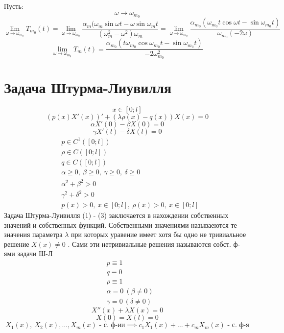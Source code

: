 \documentclass[a4paper]{article}
\begin{document}
Пусть:
\[
    \omega \to \omega_{m_0}
\]
\[
    \lim_{\omega \to \omega_{m_0}} T_{m_0}(t) = \lim_{\omega \to \omega_{m_0}} 
    \frac{\alpha_m (\omega_m \sin \omega t - \omega \sin \omega_m t}
    {(\omega_m^2 - \omega^2)\omega_m} = \lim_{\omega \to \omega_{m_0}}
    \frac{\alpha_{m_0}(\omega_{m_0} t \cos\omega t - \sin \omega_{m_0} t)}
    {\omega_{m_0}(-2 \omega)} 
\]
\[
    \lim_{\omega \to \omega_{m_0}} T_m(t) = 
    \frac{\alpha_{m_0}(t \omega_{m_0}\cos\omega_{m_0} t - \sin \omega_{m_0} t)}
    {-2 \omega_{m_0}^2} 
\]
\section*{Задача Штурма-Лиувилля}

\[
    x \in [0;l]
\]
\begin{equation}
    (p(x)X'(x))' + (\lambda\rho(x) - q(x)) X(x) = 0
\end{equation}
\begin{equation}
    \alpha X'(0) - \beta X(0) = 0
\end{equation}
\begin{equation}
    \gamma X'(l) - \delta X(l) = 0
\end{equation}
\begin{equation}
    \begin{aligned}
        &p \in C^{1}([0;l])\\
        &\rho \in C([0;l])\\
        &q \in C([0;l])\\
        &\alpha \geq 0, \ \beta \geq 0, \ \gamma \geq 0, \ \delta \geq 0\\
        &\alpha^2 + \beta^2 > 0\\
        &\gamma^2 + \delta^2 > 0\\
        &p(x) > 0, \ x \in [0;l], \ \rho(x) > 0, \ x \in [0;l]
    \end{aligned}
    \label{eq:4}
\end{equation}
Задача Штурма-Луивилля (1) - (3) заключается в нахождении собственных значений
и собственных функций. Собственными значениями называеются те значения параметра
$ \lambda $ при которых уравение имеет хотя бы одно не тривиальное решение $ X(x) \neq 0 $ 
. Сами эти нетривиальные решения называются собст. ф-ями задачи Ш-Л
\[
    \begin{aligned}
        &p \equiv 1\\
        &q \equiv 0\\
        &\rho \equiv 1\\
        &\alpha = 0 \ (\beta \neq 0)\\
        &\gamma = 0 \ (\delta \neq 0)
    \end{aligned}
\]
\[
    X''(x) + \lambda X(x) = 0
\]
\[
    X(0) = X(l) = 0
\]
\[
    X_1(x), \ X_2(x), \dots , X_m(x) \text{ - с. ф-ии} \implies c_1 X_1(x) +
    \dots + c_m X_m(x) \text{ - с. ф-я}
\]
\end{document}
